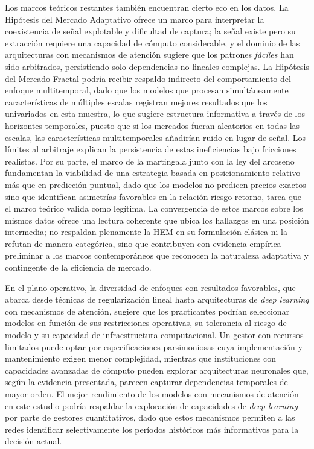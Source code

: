 ﻿\documentclass[11pt,a4paper]{article}
\begin{document}
Los marcos te\'oricos restantes tambi\'en encuentran cierto eco en los datos. La Hip\'otesis del Mercado Adaptativo \citep{lo2019} ofrece un marco para interpretar la coexistencia de se\~nal explotable y dificultad de captura; la se\~nal existe pero su extracci\'on requiere una capacidad de c\'omputo considerable, y el dominio de las arquitecturas con mecanismos de atenci\'on sugiere que los patrones \textit{f\'aciles} han sido arbitrados, persistiendo solo dependencias no lineales complejas. La Hip\'otesis del Mercado Fractal \citep{peters1994} podr\'ia recibir respaldo indirecto del comportamiento del enfoque multitemporal, dado que los modelos que procesan simult\'aneamente caracter\'isticas de m\'ultiples escalas registran mejores resultados que los univariados en esta muestra, lo que sugiere estructura informativa a trav\'es de los horizontes temporales, puesto que si los mercados fueran aleatorios en todas las escalas, las caracter\'isticas multitemporales a\~nadir\'ian ruido en lugar de se\~nal. Los l\'imites al arbitraje \citep{shleifer1997} explican la persistencia de estas ineficiencias bajo fricciones realistas. Por su parte, el marco de la martingala \citep{samuelson1965} junto con la ley del arcoseno \citep{levy1939,feller1968} fundamentan la viabilidad de una estrategia basada en posicionamiento relativo m\'as que en predicci\'on puntual, dado que los modelos no predicen precios exactos sino que identifican asimetr\'ias favorables en la relaci\'on riesgo-retorno, tarea que el marco te\'orico valida como leg\'itima. La convergencia de estos marcos sobre los mismos datos ofrece una lectura coherente que ubica los hallazgos en una posici\'on intermedia; no respaldan plenamente la HEM en su formulaci\'on cl\'asica ni la refutan de manera categ\'orica, sino que contribuyen con evidencia emp\'irica preliminar a los marcos contempor\'aneos que reconocen la naturaleza adaptativa y contingente de la eficiencia de mercado.

En el plano operativo, la diversidad de enfoques con resultados favorables, que abarca desde t\'ecnicas de regularizaci\'on lineal hasta arquitecturas de \textit{deep learning} con mecanismos de atenci\'on, sugiere que los practicantes podr\'ian seleccionar modelos en funci\'on de sus restricciones operativas, su tolerancia al riesgo de modelo y su capacidad de infraestructura computacional. Un gestor con recursos limitados puede optar por especificaciones parsimoniosas cuya implementaci\'on y mantenimiento exigen menor complejidad, mientras que instituciones con capacidades avanzadas de c\'omputo pueden explorar arquitecturas neuronales que, seg\'un la evidencia presentada, parecen capturar dependencias temporales de mayor orden. El mejor rendimiento de los modelos con mecanismos de atenci\'on en este estudio podr\'ia respaldar la exploraci\'on de capacidades de \textit{deep learning} por parte de gestores cuantitativos, dado que estos mecanismos permiten a las redes identificar selectivamente los per\'iodos hist\'oricos m\'as informativos para la decisi\'on actual.
\end{document}
